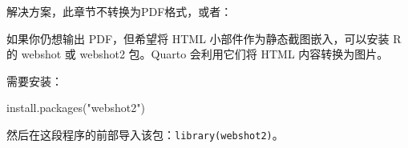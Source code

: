 \documentclass[
  letterpaper,
  DIV=11,
  numbers=noendperiod]{scrartcl}
\newenvironment{Shaded}{\begin{snugshade}}{\end{snugshade}}
\newcommand{\FunctionTok}[1]{\textcolor[rgb]{0.28,0.35,0.67}{#1}}
\newcommand{\NormalTok}[1]{\textcolor[rgb]{0.00,0.23,0.31}{#1}}
\newcommand{\StringTok}[1]{\textcolor[rgb]{0.13,0.47,0.30}{#1}}
\begin{document}
解决方案，此章节不转换为PDF格式，或者：

如果你仍想输出 PDF，但希望将 HTML 小部件作为静态截图嵌入，可以安装 R 的
webshot 或 webshot2 包。Quarto 会利用它们将 HTML 内容转换为图片。

需要安装：

\begin{Shaded}
\begin{Highlighting}[]
\FunctionTok{install.packages}\NormalTok{(}\StringTok{"webshot2"}\NormalTok{)}
\end{Highlighting}
\end{Shaded}

然后在这段程序的前部导入该包：\texttt{library(webshot2)}。
\end{document}
